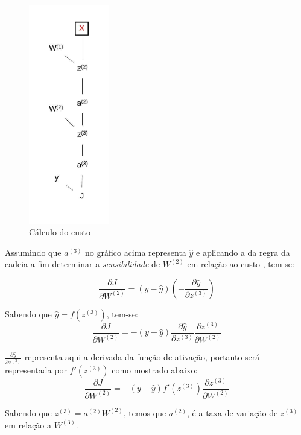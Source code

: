 \begin{figure}[H]
    \centering
  \includegraphics[width=100pt]{figuras/derivadas_parciais_um_no_por_camada.jpeg}
  \caption{Cálculo do custo}
  \label{fig:derivadas_parciais_um_no_por_camada}
\end{figure}

Assumindo que $a^{(3)}$ no gráfico acima representa $\hat{y}$ e aplicando a da regra da cadeia a fim determinar a \textit{sensibilidade} de $W^{(2)}$ em relação ao custo , tem-se:

\begin{equation}
    \frac{\partial J}{\partial W^{(2)}} = (y - \hat{y})(-\frac{\partial \hat{y}}{\partial z^{(3)}})
\end{equation}

Sabendo que $\hat{y}=f(z^{(3)})$, tem-se:
\begin{equation}
    \frac{\partial J}{\partial W^{(2)}} = -(y - \hat{y})\frac{\partial \hat{y}}{\partial z^{(3)}}\frac{\partial z^{(3)}}{\partial W^{(2)}}
\end{equation}

$\frac{\partial \hat{y}}{\partial z^{(3)}}$ representa aqui a derivada da função de ativação, portanto será representada por $f'(z^{(3)})$ como mostrado abaixo:
\begin{equation}
    \frac{\partial J}{\partial W^{(2)}} = -(y - \hat{y}) f'(z^{(3)}) \frac{\partial z^{(3)}}{\partial W^{(2)}}
\end{equation}

Sabendo que $z^{(3)}=a^{(2)}W^{(2)}$, temos que $a^{(2)}$, é a taxa de variação de $z^{(3)}$ em relação a $W^{(3)}$.

